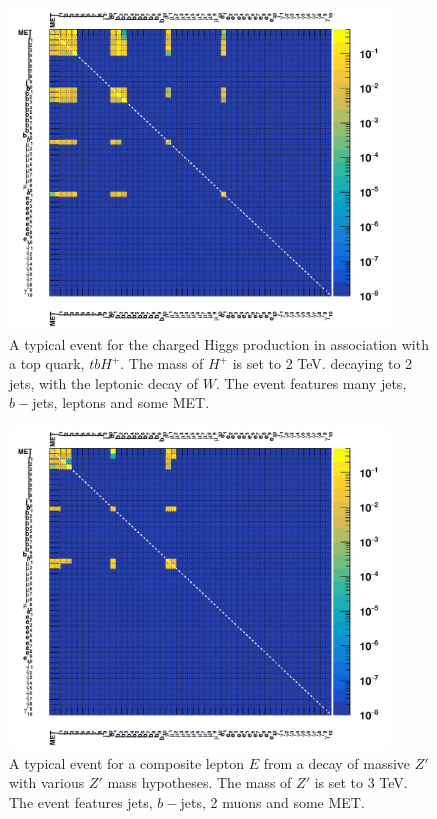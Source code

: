 \begin{figure}[H]
    \begin{center}
        \includegraphics[width=0.9\textwidth]{figs/app/validate_event1_hsplus.pdf}
    \end{center}
    \caption{
    A typical event for the charged Higgs production in association with a top quark, $tbH^{+}$.
    The mass of $H^{+}$ is set to 2 TeV.
    decaying to 2 jets, with the leptonic decay of $W$.
    The event features many jets, $b-$jets, leptons and some  MET.
    }
    \label{fig:rmm_tt3}
\end{figure}

\begin{figure}[H]
    \begin{center}
        \includegraphics[width=0.9\textwidth]{figs/app/validate_event1_complep.pdf}
    \end{center}
    \caption{
    A typical event for a composite lepton $E$ from a decay of massive $Z'$ with various $Z'$ mass hypotheses.
    The mass of $Z'$ is set to 3 TeV.
    The event features jets, $b-$jets, 2 muons  and some  MET.
    }
\label{fig:rmm_tt4}
\end{figure}

